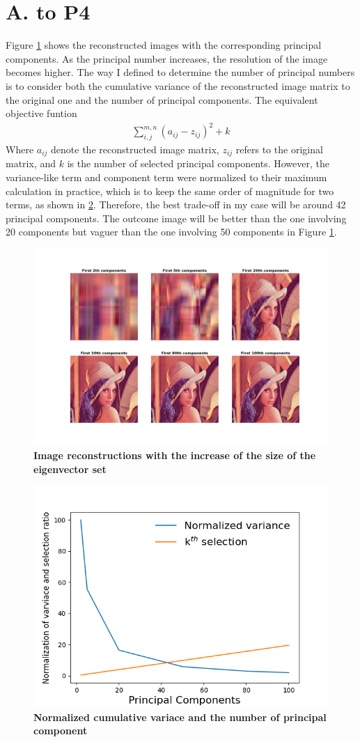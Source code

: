 \documentclass[11pt]{article}
\newcommand{\mfile}[1]  {{\small }} %
\begin{document}
	\section*{A. to P4}
	Figure \ref{fig:p3} shows the reconstructed images with the corresponding principal components. As the principal number increases, the resolution of the image becomes higher. The way I defined to determine the number of principal numbers is to consider both the cumulative variance of the reconstructed image matrix to the original one and the number of principal components. The equivalent objective funtion
	\begin{align*}
	\sum_{i,j}^{m,n}\left(a_{ij}-z_{ij}\right)^2+k
	\end{align*}
	Where $a_{ij}$ denote the reconstructed image matrix, $z_{ij}$ refers to the original matrix, and $k$ is the number of selected principal components. However, the variance-like term and component term were normalized to their maximum calculation in practice, which is to keep the same order of magnitude for two terms, as shown in \ref{fig:p4}. Therefore, the best trade-off in my case will be around 42 principal components. The outcome image will be better than the one involving 20 components but vaguer than the one involving 50 components in Figure \ref{fig:p3}.
	\begin{figure}
		\centering\includegraphics[width=.75\linewidth]{prob4.png}
		\caption{ \bf Image reconstructions with the increase of the size of the eigenvector set} %
		\label{fig:p3}
	\end{figure}
	\mfile{prob4.py}
	\begin{figure}
		\centering\includegraphics[width=.75\linewidth]{prob4-2.png}
		\caption{ \bf Normalized cumulative variace and the number of principal component} %
		\label{fig:p4}
	\end{figure}
	\mfile{prob4.py}
	\mfile{prob4-2.py}
\end{document}
